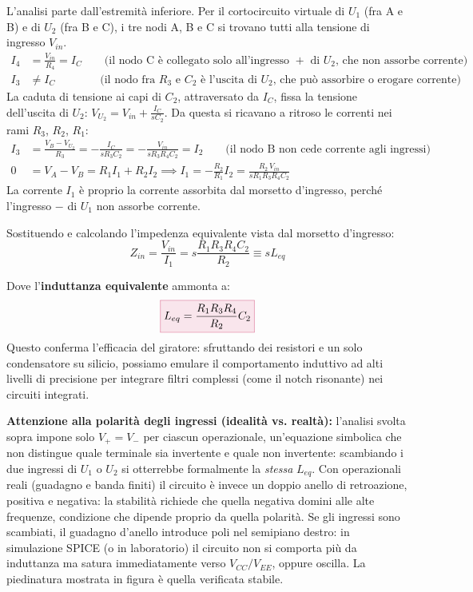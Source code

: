 L'analisi parte dall'estremità inferiore. Per il cortocircuito virtuale di $U_1$ (fra A e B) e di $U_2$ (fra B e C), i tre nodi A, B e C si trovano tutti alla tensione di ingresso $V_{in}$.
\begin{align*}
    I_4 &= \frac{V_{in}}{R_4} = I_C \qquad \text{(il nodo C è collegato solo all'ingresso $+$ di $U_2$, che non assorbe corrente)} \\
    I_3 &\neq I_C \qquad\qquad \text{(il nodo fra $R_3$ e $C_2$ è l'uscita di $U_2$, che può assorbire o erogare corrente)}
\end{align*}
La caduta di tensione ai capi di $C_2$, attraversato da $I_C$, fissa la tensione dell'uscita di $U_2$: $V_{U_2} = V_{in} + \frac{I_C}{sC_2}$. Da questa si ricavano a ritroso le correnti nei rami $R_3$, $R_2$, $R_1$:
\begin{align*}
    I_3 &= \frac{V_B - V_{U_2}}{R_3} = -\frac{I_C}{s R_3 C_2} = -\frac{V_{in}}{s R_3 R_4 C_2} = I_2 \qquad \text{(il nodo B non cede corrente agli ingressi)} \\
    0 &= V_A - V_B = R_1 I_1 + R_2 I_2 \implies I_1 = -\frac{R_2}{R_1}I_2 = \frac{R_2\,V_{in}}{s R_1 R_3 R_4 C_2}
\end{align*}
La corrente $I_1$ è proprio la corrente assorbita dal morsetto d'ingresso, perché l'ingresso $-$ di $U_1$ non assorbe corrente.

Sostituendo e calcolando l'impedenza equivalente vista dal morsetto d'ingresso:
\begin{equation}
Z_{in} = \frac{V_{in}}{I_1} = s \frac{R_1 R_3 R_4 C_2}{R_2} \equiv s L_{eq}
\end{equation}

Dove l'\textbf{induttanza equivalente} ammonta a:
\begin{equation}
\fcolorbox{purple!60}{purple!10}{$\displaystyle L_{eq} = \frac{R_1 R_3 R_4}{R_2} C_2$}
\end{equation}
Questo conferma l'efficacia del giratore: sfruttando dei resistori e un solo condensatore su silicio, possiamo emulare il comportamento induttivo ad alti livelli di precisione per integrare filtri complessi (come il notch risonante) nei circuiti integrati.

\begin{note}
\textbf{Attenzione alla polarità degli ingressi (idealità vs. realtà):} l'analisi svolta sopra impone solo $V_+=V_-$ per ciascun operazionale, un'equazione simbolica che non distingue quale terminale sia invertente e quale non invertente: scambiando i due ingressi di $U_1$ o $U_2$ si otterrebbe formalmente la \emph{stessa} $L_{eq}$. Con operazionali reali (guadagno e banda finiti) il circuito è invece un doppio anello di retroazione, positiva e negativa: la stabilità richiede che quella negativa domini alle alte frequenze, condizione che dipende proprio da quella polarità. Se gli ingressi sono scambiati, il guadagno d'anello introduce poli nel semipiano destro: in simulazione SPICE (o in laboratorio) il circuito non si comporta più da induttanza ma satura immediatamente verso $V_{CC}/V_{EE}$, oppure oscilla. La piedinatura mostrata in figura è quella verificata stabile.
\end{note}

